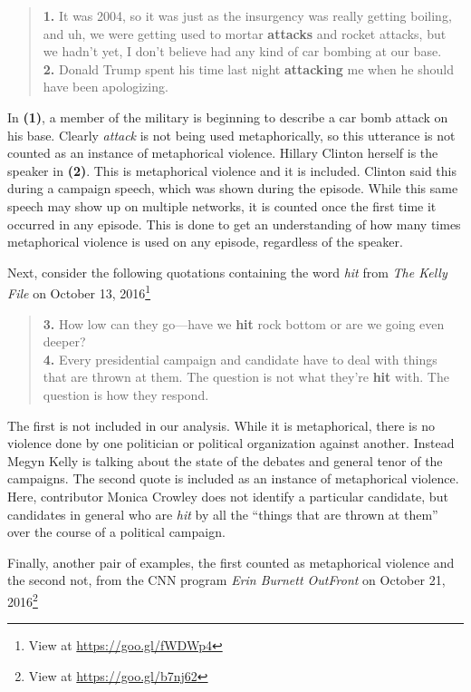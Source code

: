 \begin{quotation}
  \noindent
  \textbf{1.} It was 2004, so it was just as the insurgency was really getting boiling, and uh,
    we were getting used to mortar \textbf{attacks} and rocket attacks, 
    but we hadn't yet, I don't believe had any kind of car bombing at our base. \\
  \textbf{2.} Donald Trump spent his time last night \textbf{attacking} me when he should have been
    apologizing.
\end{quotation}

\noindent
In \textbf{(1)}, a member of the military is beginning to describe a car bomb 
attack on his base. Clearly \textit{attack} is not being used metaphorically,
so this utterance is not counted as an instance of metaphorical violence. 
Hillary Clinton herself is the speaker in \textbf{(2)}.
This is metaphorical violence and it is included. Clinton said this during a
campaign speech, which was shown during the episode. While this same speech
may show up on multiple networks, it is counted once the first time it
occurred in any episode. This is done to get an understanding of how many times
metaphorical violence is used on any episode, regardless of the speaker. 

Next, consider
the following quotations containing the word \textit{hit} from 
\textit{The Kelly File} on October 13, 2016\footnote{View at \url{https://goo.gl/fWDWp4}}

\begin{quotation}
  \noindent
  \textbf{3.} How low can they go---have we \textbf{hit} rock bottom or are we
    going even deeper? \\
  \textbf{4.} Every presidential campaign and candidate have to deal with
  things that are thrown at them. The question is not what they're \textbf{hit} with. The
  question is how they respond.
\end{quotation}

\noindent
The first is not included in our analysis. While it is metaphorical, 
there is no violence done by one
politician or political organization against another. Instead Megyn Kelly is talking about the
state of the debates and general tenor of the campaigns. The second quote is
included as an instance of metaphorical violence. Here, contributor
Monica Crowley does not identify a particular candidate, but candidates
in general who are \textit{hit} by all the ``things that are thrown at them'' over
the course of a political campaign. 

Finally, another pair of examples, the first counted as metaphorical violence and the second not, 
from the CNN program \textit{Erin Burnett OutFront} on October 21, 
2016\footnote{View at \url{https://goo.gl/b7nj62}}

